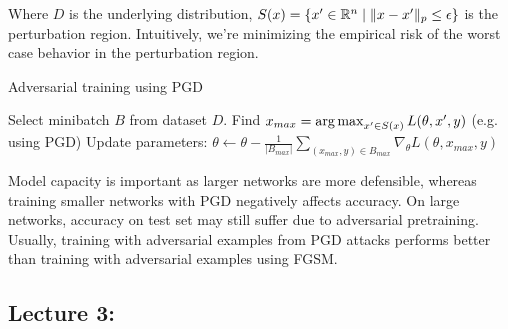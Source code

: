 \documentclass[11pt]{article}
\begin{document}
Where $D$ is the underlying distribution, $S(x) = \{x' \in \mathbb{R}^n \mid \lVert x - x' \rVert_p \leq \epsilon \}$ is the perturbation region. Intuitively, we're minimizing the empirical risk of the worst case behavior in the perturbation region.

\begin{algorithm}
\caption{Adversarial training using PGD}
\begin{algorithmic}[1]
\State Select minibatch $B$ from dataset $D$.
	\State Find $x_{max} = \operatorname*{arg\,max}_{x' \in S(x)} L(\theta, x', y)$ (e.g. using PGD)
\EndFor
\State Update parameters: $\theta \gets \theta - \frac{1}{|B_{max}|}\sum_{(x_{max}, y) \in B_{max}} \nabla_{\theta} L(\theta, x_{max}, y)$
\end{algorithmic}
\end{algorithm}

Model capacity is important as larger networks are more defensible, whereas training smaller networks with PGD negatively affects accuracy. On large networks, accuracy on test set may still suffer due to adversarial pretraining. Usually, training with adversarial examples from PGD attacks performs better than training with adversarial examples using FGSM.


\newpage
\subsection{Lecture 3: }

\newpage
\printbibliography
\end{document}

